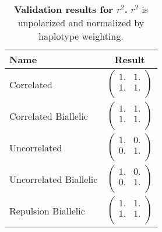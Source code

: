 \documentclass[12pt]{article}
\begin{document}
\begin{table}[H]
  \begin{tabular}{lc} Name & Result \\
    \hline
    Correlated & $\left(\begin{array}{cc}
                          1. & 1. \\
                          1. & 1. \\
                        \end{array}\right)$ \\
    Correlated Biallelic & $\left(\begin{array}{cc}
                                    1. & 1. \\
                                    1. & 1. \\
                                  \end{array}\right)$ \\
    Uncorrelated & $\left(\begin{array}{cc}
                            1. & 0. \\
                            0. & 1. \\
                          \end{array}\right)$ \\
    Uncorrelated Biallelic & $\left(\begin{array}{cc}
                                      1. & 0. \\
                                      0. & 1. \\
                                    \end{array}\right)$ \\
    Repulsion Biallelic & $\left(\begin{array}{cc}
                                   1. & 1. \\
                                   1. & 1. \\
                                 \end{array}\right)$ \\
  \end{tabular}
  \caption{
    \textbf{Validation results for $r^2$.}
    $r^2$ is unpolarized and normalized by haplotype weighting.
  }
\end{table}










\end{document}
